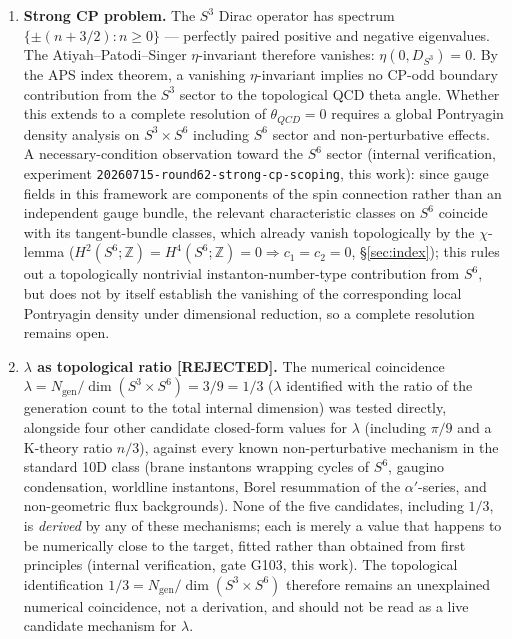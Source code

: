 \documentclass[12pt,a4paper]{article}
\newcommand{\ZZ}{\mathbb{Z}}
\begin{document}
\begin{enumerate}
\item \textbf{Strong CP problem.} The $S^3$ Dirac operator has spectrum $\{\pm(n+3/2): n\geq 0\}$
  --- perfectly paired positive and negative eigenvalues. The Atiyah--Patodi--Singer $\eta$-invariant
  therefore vanishes: $\eta(0, D_{S^3})=0$. By the APS index theorem, a vanishing $\eta$-invariant
  implies no CP-odd boundary contribution from the $S^3$ sector to the topological QCD theta angle.
  Whether this extends to a complete resolution of $\theta_{QCD}=0$ requires a global Pontryagin
  density analysis on $S^3\times S^6$ including $S^6$ sector and non-perturbative effects. A
  necessary-condition observation toward the $S^6$ sector (internal verification, experiment
  \texttt{20260715-round62-strong-cp-scoping}, this work): since gauge fields in this framework
  are components of the spin connection rather than an independent gauge bundle, the relevant
  characteristic classes on $S^6$ coincide with its tangent-bundle classes, which already vanish
  topologically by the $\chi$-lemma ($H^2(S^6;\ZZ)=H^4(S^6;\ZZ)=0\Rightarrow c_1=c_2=0$,
  \S\ref{sec:index}); this rules out a topologically nontrivial instanton-number-type
  contribution from $S^6$, but does not by itself establish the vanishing of the corresponding
  local Pontryagin density under dimensional reduction, so a complete resolution remains open.

\item \textbf{$\lambda$ as topological ratio [REJECTED].}
  The numerical coincidence $\lambda = N_{\mathrm{gen}}/\dim(S^3\times S^6) = 3/9 = 1/3$
  ($\lambda$ identified with the ratio of the generation count to the total internal
  dimension) was tested directly, alongside four other candidate closed-form values for
  $\lambda$ (including $\pi/9$ and a K-theory ratio $n/3$), against every known
  non-perturbative mechanism in the standard 10D class (brane instantons wrapping
  cycles of $S^6$, gaugino condensation, worldline instantons, Borel resummation of the
  $\alpha'$-series, and non-geometric flux backgrounds). None of the five candidates,
  including $1/3$, is \emph{derived} by any of these mechanisms; each is merely a value
  that happens to be numerically close to the target, fitted rather than obtained from
  first principles (internal verification, gate G103, this work). The topological
  identification $1/3=N_{\mathrm{gen}}/\dim(S^3\times S^6)$ therefore remains an
  unexplained numerical coincidence, not a derivation, and should not be read as a live
  candidate mechanism for $\lambda$.


\end{enumerate}
\end{document}
